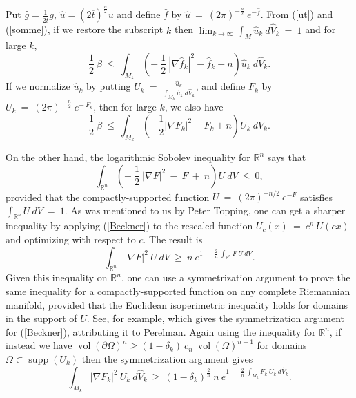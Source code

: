 \documentclass[12pt]{amsart}
\newcommand{\R}{{\mathbb R}}
\newcommand{\supp}{\operatorname{supp}}
\newcommand{\vol}{\operatorname{vol}}
\numberwithin{equation}{section}
\theoremstyle{plain}
\theoremstyle{definition}
\theoremstyle{remark}
\begin{document}
Put $\widehat{g} = \frac{1}{2\overline{t}} g$,
$\widehat{u} = (2 \overline{t})^{\frac{n}{2}} \widetilde{u}$ and define
$\widehat{f}$ by $\widehat{u} \: = \: (2\pi)^{-\frac{n}{2}} \: e^{-\widehat{f}}$.
From (\ref{ut}) and (\ref{somme}), if we restore the subscript $k$ then
$\lim_{k \rightarrow \infty} \int_M \widehat{u}_k \: d\widehat{V}_k \: = \: 1$ and for large $k$,
\begin{equation} 
\frac12 \: \beta \: \le \: \int_{M_k} 
\left( - \: \frac12 \: |\nabla \widehat{f}_k|^2 - \widehat{f}_k + n
\right)
\widehat{u}_k \: d\widehat{V}_k.
\end{equation}
If we normalize $\widehat{u}_k$ by putting
$U_k \: = \: \frac{\widehat{u}_k}{\int_{M_k} \widehat{u}_k \: d\widehat{V}_k}$, 
and
define $F_k$ by $U_k \: = \: (2\pi)^{- \: \frac{n}{2}} \: e^{- \: F_k}$, then
for large $k$, we also have
\begin{equation} \label{contra1}
\frac12 \: \beta \: \le \: \int_{M_k} 
\left( - \frac12 |\nabla {F}_k|^2 - {F}_k + n
\right)
{U}_k \: d\widehat{V}_k.
\end{equation}

On the other hand, the
logarithmic Sobolev inequality for $\R^n$ \cite[I.(8)]{Beckner} says that
\begin{equation} \label{Beckner}
\int_{\R^n} \left( - \: \frac12 \: |\nabla F|^2 \: - \: F \: + \: n \right) U \: dV
\: \le \: 0,
\end{equation}
provided that the compactly-supported function
$U \: = \: (2 \pi)^{-n/2} \: e^{-F}$ satisfies
$\int_{\R^n} U \: dV \: = \: 1$.
As was mentioned to us by Peter Topping, one can get a sharper inequality
by applying (\ref{Beckner}) to the rescaled function
$U_c(x) \: = \: c^n \: U(cx)$ and optimizing with respect to $c$.
The result is
\begin{equation}
\int_{\R^n} |\nabla F|^2 \: U \: dV \: \ge \: n \: e^{1 \: - \: \frac{2}{n} \:
\int_{\R^n} F \: U \: dV}.
\end{equation}
Given this inequality on $\R^n$,
one can use a symmetrization argument to prove the same
inequality for a compactly-supported function on any complete Riemannian
manifold, provided that the Euclidean isoperimetric
inequality holds for domains in the support of $U$.
See, for example, \cite[Proposition 4.1]{Ni3} which gives 
the symmetrization argument for
(\ref{Beckner}), attributing it to Perelman.
Again using the inequality for $\R^n$, if instead we have
$\vol(\partial \Omega)^n
\ge (1-\delta_k) \: c_n \: \vol(\Omega)^{n-1}$ for domains
$\Omega \subset \supp(U_k)$ then the symmetrization argument gives
\begin{equation} \label{contra2}
\int_{M_k} |\nabla {F}_k|^2 \: {U}_k \: d\widehat{V}_k \: \ge \:
(1 - \delta_k)^{\frac{2}{n}} \: 
n \: e^{1 \: - \: \frac{2}{n} \:
\int_{M_k} {F}_k \: U_k \: d\widehat{V}_k}.
\end{equation}
\end{document}

